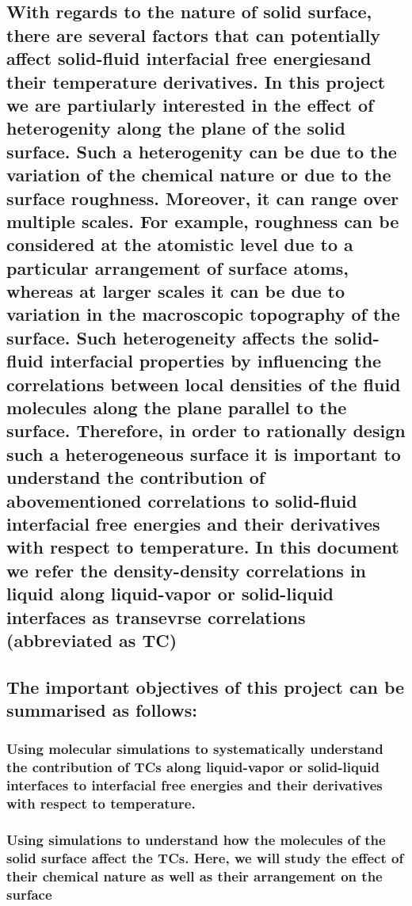 \documentclass[a4paper,12pt,single,pdftex]{scrartcl}
\begin{document}
\label{ID_412834846}\subsection{With regards to the nature of solid surface, there are several factors that can potentially affect solid-fluid interfacial free energiesand their temperature derivatives. In this project we are partiularly interested in the effect of heterogenity along the plane of the solid surface. Such a heterogenity can be due to the variation of the chemical nature or due to the surface roughness. Moreover,  it can range over multiple scales. For example, roughness can be considered at the atomistic level due to a particular arrangement of surface atoms, whereas at larger scales it can be due to variation in the macroscopic topography of the surface. Such heterogeneity affects the solid-fluid interfacial properties by influencing the correlations between local densities of the fluid molecules along the plane parallel to the surface. Therefore, in order to rationally design such a heterogeneous surface it is important to understand the contribution of abovementioned correlations to solid-fluid interfacial free energies and their derivatives with respect to temperature. In this document we refer the density-density correlations in liquid along liquid-vapor or solid-liquid interfaces as transevrse correlations (abbreviated as TC)}

\label{ID_350936959}\subsection{The important objectives of this project can be summarised as follows:}

\label{ID_1343604658}\subsubsection{Using molecular simulations to systematically understand the contribution of TCs along liquid-vapor or solid-liquid interfaces to interfacial free energies and their derivatives with respect to temperature.}

\label{ID_1036554838}\subsubsection{Using simulations to understand how the molecules of the solid surface affect the TCs. Here, we will study the effect of their chemical nature as well as their arrangement on the surface}
\end{document}
